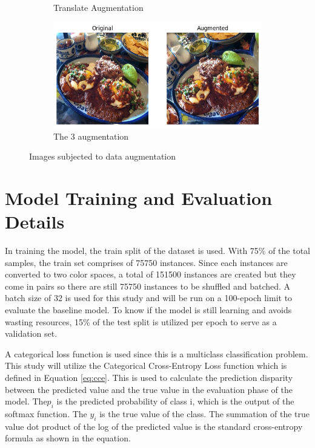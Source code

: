 \begin{figure}[htbp]
\begin{subfigure}[b]{0.45\textwidth}
    \caption{Translate Augmentation}
    \label{fig:translated}
  \end{subfigure}
  \hfill
  \begin{subfigure}[b]{0.45\textwidth}
    \includegraphics[width=\textwidth]{graphics/images/augmentation/augmented.png}
    \caption{The 3 augmentation}
    \label{fig:augmented}
  \end{subfigure}
  
  \caption{Images subjected to data augmentation}
  \label{fig:augmentation}
\end{figure}

\section{Model Training and Evaluation Details}
In training the model, the train split of the dataset is used. With 75\% of the total samples, the train set comprises of 75750 instances. Since each instances are converted to two color spaces, a total of 151500 instances are created but they come in pairs so there are still 75750 instances to be shuffled and batched. A batch size of 32 is used for this study and will be run on a 100-epoch limit to evaluate the baseline model. To know if the model is still learning and avoids wasting resources, 15\% of the test split is utilized per epoch to serve as a validation set.

A categorical loss function is used since this is a multiclass classification problem. This study will utilize the Categorical Cross-Entropy Loss function \cite{kumar-2018} which is defined in Equation \ref{eq:cce}. This is used to calculate the prediction disparity between the predicted value and the true value in the evaluation phase of the model. The\(p_i\) is the predicted probability of class i, which is the output of the softmax function. The \(y_i\) is the true value of the class. The summation of the true value dot product of the log of the predicted value is the standard cross-entropy formula as shown in the equation.

